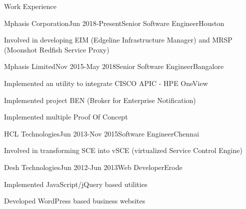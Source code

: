 \documentclass{resume} %
\begin{document}
\begin{rSection}{ Work Experience } \itemsep -1pt        

\begin{rSubsection}{Mphasis Corporation}{Jun 2018-Present}{Senior Software Engineer}{Houston}    

\vspace{-3pt}

\item Involved in developing EIM (Edgeline Infrastructure Manager) and MRSP (Moonshot Redfish Service Proxy)
\end{rSubsection} 

\vspace{-4pt}


\begin{rSubsection}{Mphasis Limited}{Nov 2015-May 2018}{Senior Software Engineer}{Bangalore}    

\vspace{-3pt}

\item Implemented an utility to integrate CISCO APIC - HPE OneView 
\item Implemented project BEN (Broker for Enterprise Notification)
\item Implemented multiple Proof Of Concept
\end{rSubsection} 

\vspace{-4pt}


\begin{rSubsection}{HCL Technologies}{Jun 2013-Nov 2015}{Software Engineer}{Chennai}    

\vspace{-3pt}

\item Involved in transforming SCE into vSCE (virtualized Service Control Engine)

\end{rSubsection} 

\vspace{-4pt}


\begin{rSubsection}{Desh Technologies}{Jun 2012-Jun 2013}{Web Developer}{Erode}    

\vspace{-3pt}

\item Implemented JavaScript/jQuery based utilities 
\item Developed WordPress based business websites

\end{rSubsection} 

 
\end{rSection}
\end{document}
